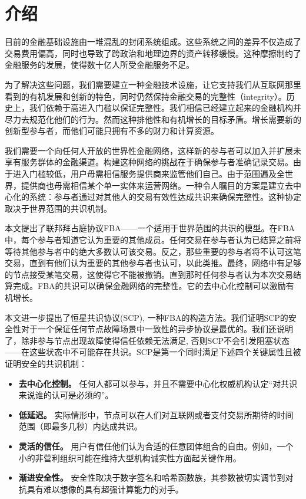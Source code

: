 \section{介绍}

目前的金融基础设施由一堆混乱的封闭系统组成。这些系统之间的差异不仅造成了交易费用偏高，同时也导致了跨政治和地理边界的资产转移缓慢。这种摩擦制约了金融服务的发展，使得数十亿人所受金融服务不足。

为了解决这些问题，我们需要建立一种金融技术设施，让它支持我们从互联网那里看到的有机发展和创新的特色，同时仍然保持金融交易的完整性（integrity）。历史上，我们依赖于高进入门槛以保证完整性。我们相信已经建立起来的金融机构并尽力去规范化他们的行为。然而这种排他性和有机增长的目标矛盾。增长需要新的创新型参与者，而他们可能只拥有不多的财力和计算资源。

我们需要一个向任何人开放的世界性金融网络，这样新的参与者可以加入并扩展未享有服务群体的金融渠道。构建这种网络的挑战在于确保参与者准确记录交易。由于进入门槛较低，用户毋需相信服务提供商来监管他们自己。由于范围遍及全世界，提供商也毋需相信某个单一实体来运营网络。一种令人瞩目的方案是建立去中心化的系统：参与者通过对其他人的交易有效性达成共识来确保完整性。这种协定取决于世界范围的共识机制。

本文提出了联邦拜占庭协议FBA——一个适用于世界范围的共识的模型。在FBA中，每个参与者知道它认为重要的其他成员。任何交易在参与者认为已结算之前将等待其他参与者中的绝大多数认可该交易。反之，那些重要的参与者将不认可这笔交易，直到有他们认为重要的其他参与者也认可，以此类推。最终，网络中有足够的节点接受某笔交易，这使得它不能被撤销。直到那时任何参与者认为本次交易结算完成。FBA的共识可以确保金融网络的完整性。它的去中心化控制可以激励有机增长。

本文进一步提出了恒星共识协议(SCP), 一种FBA的构造方法。我们证明SCP的安全性对于一个保证任何节点故障场景中一致性的异步协议是最优的。我们还说明了，除非参与节点出现故障使得信任依赖无法满足, 否则SCP不会引发阻塞状态——在这些状态中不可能存在共识。SCP是第一个同时满足下述四个关键属性且被证明安全的共识机制：

\begin{itemize}
	\item \textbf{去中心化控制。} 任何人都可以参与，并且不需要中心化权威机构认定``对共识来说谁的认可是必须的''。
	\item \textbf{低延迟。} 实际情形中，节点可以在人们对互联网或者支付交易所期待的时间范围（即最多几秒）内达成共识。
	\item \textbf{灵活的信任。} 用户有信任他们认为合适的任意团体组合的自由。例如，一个小的非营利组织可能在维持大型机构诚实性方面起关键作用。
	\item \textbf{渐进安全性。} 安全性取决于数字签名和哈希函数族，其参数被切实调节到对抗具有难以想像的具有超强计算能力的对手。
\end{itemize}

